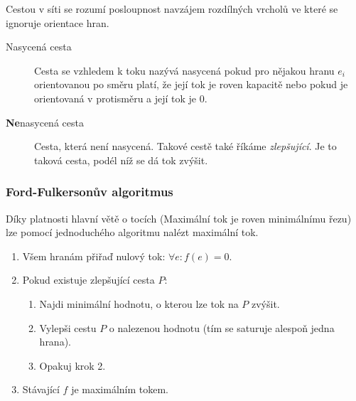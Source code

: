 Cestou v síti se rozumí posloupnost navzájem rozdílných vrcholů ve které se ignoruje orientace hran.

\begin{description}
    \item[Nasycená cesta] Cesta se vzhledem k toku nazývá nasycená pokud pro nějakou hranu $e_i$ orientovanou po směru platí, že její tok je roven kapacitě nebo pokud je orientovaná v protisměru a její tok je $0$.
    \item[\textbf{Ne}nasycená cesta] Cesta, která není nasycená.
    Takové cestě také říkáme \textit{zlepšující}.
    Je to taková cesta, podél níž se dá tok zvýšit.
\end{description}


\subsubsection{Ford-Fulkersonův algoritmus}\label{alg:ford-fulkerson}

Díky platnosti hlavní větě o tocích (Maximální tok je roven minimálnímu řezu) lze pomocí jednoduchého algoritmu nalézt maximální tok.

\begin{enumerate}
    \item Všem hranám přiřaď nulový tok: $\forall e: f(e) = 0$.
    \item Pokud existuje zlepšující cesta $P$:
    \begin{enumerate}
        \item Najdi minimální hodnotu, o kterou lze tok na $P$ zvýšit.
        \item Vylepši cestu $P$ o nalezenou hodnotu (tím se saturuje alespoň jedna hrana).
        \item Opakuj krok 2.
    \end{enumerate}
    \item Stávající $f$ je maximálním tokem.
\end{enumerate}
